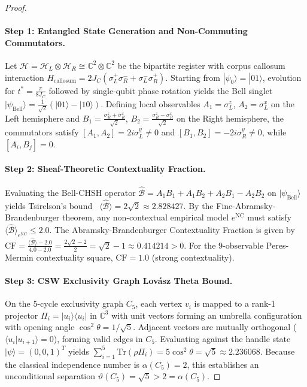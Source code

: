 \documentclass[10pt,twocolumn,3p]{article}
\begin{document}
\begin{proof}
\paragraph{Step 1: Entangled State Generation and Non-Commuting Commutators.}
Let $\mathcal{H} = \mathcal{H}_L \otimes \mathcal{H}_R \cong \mathbb{C}^2 \otimes \mathbb{C}^2$ be the bipartite register with corpus callosum interaction $H_{\text{callosum}} = 2 J_C (\sigma_L^+ \sigma_R^- + \sigma_L^- \sigma_R^+)$. Starting from $|\psi_0\rangle = |01\rangle$, evolution for $t^* = \frac{\pi}{8 J_C}$ followed by single-qubit phase rotation yields the Bell singlet $|\psi_{\text{Bell}}\rangle = \frac{1}{\sqrt{2}}(|01\rangle - |10\rangle)$. Defining local observables $A_1 = \sigma_L^z$, $A_2 = \sigma_L^x$ on the Left hemisphere and $B_1 = \frac{\sigma_R^z + \sigma_R^x}{\sqrt{2}}$, $B_2 = \frac{\sigma_R^z - \sigma_R^x}{\sqrt{2}}$ on the Right hemisphere, the commutators satisfy $[A_1, A_2] = 2i \sigma_L^y \ne 0$ and $[B_1, B_2] = -2i \sigma_R^y \ne 0$, while $[A_i, B_j] = 0$.

\paragraph{Step 2: Sheaf-Theoretic Contextuality Fraction.}
Evaluating the Bell-CHSH operator $\hat{\mathcal{B}} = A_1 B_1 + A_1 B_2 + A_2 B_1 - A_2 B_2$ on $|\psi_{\text{Bell}}\rangle$ yields Tsirelson's bound~\cite{tsirelson1980} $\langle \hat{\mathcal{B}} \rangle = 2\sqrt{2} \approx 2.828427$. By the Fine-Abramsky-Brandenburger theorem, any non-contextual empirical model $e^{\text{NC}}$ must satisfy $\langle \hat{\mathcal{B}} \rangle_{e^{\text{NC}}} \le 2.0$. The Abramsky-Brandenburger Contextuality Fraction is given by $\text{CF} = \frac{\langle \hat{\mathcal{B}} \rangle - 2.0}{4.0 - 2.0} = \frac{2\sqrt{2} - 2}{2} = \sqrt{2} - 1 \approx 0.414214 > 0$. For the 9-observable Peres-Mermin contextuality square, $\text{CF} = 1.0$ (strong contextuality).

\paragraph{Step 3: CSW Exclusivity Graph Lov\'asz Theta Bound.}
On the 5-cycle exclusivity graph $C_5$, each vertex $v_i$ is mapped to a rank-1 projector $\Pi_i = |u_i\rangle\langle u_i|$ in $\mathbb{C}^3$ with unit vectors forming an umbrella configuration with opening angle $\cos^2\theta = 1/\sqrt{5}$. Adjacent vectors are mutually orthogonal ($\langle u_i | u_{i+1} \rangle = 0$), forming valid edges in $C_5$. Evaluating against the handle state $|\psi\rangle = (0, 0, 1)^T$ yields $\sum_{i=1}^5 \text{Tr}(\rho \Pi_i) = 5 \cos^2\theta = \sqrt{5} \approx 2.236068$. Because the classical independence number is $\alpha(C_5) = 2$, this establishes an unconditional separation $\vartheta(C_5) = \sqrt{5} > 2 = \alpha(C_5)$.


\end{proof}
\end{document}
